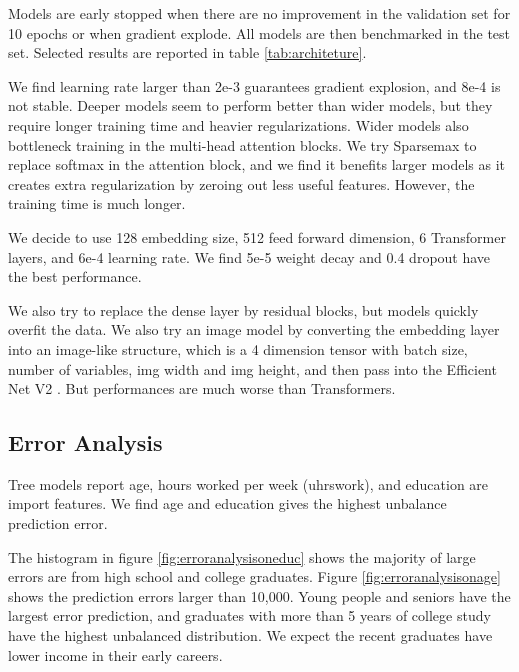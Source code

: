 \documentclass[11pt, letter,twocolumn]{article}
\begin{document}
Models are early stopped when there are no improvement in the validation set for 10 epochs or when gradient explode. All models are then benchmarked in the test set. Selected results are reported in table \ref{tab:architeture}.  
 


We find learning rate larger than 2e-3 guarantees gradient explosion, and 8e-4  is not stable.  Deeper models seem to perform better than wider models, but they require longer training time and heavier regularizations. Wider models also bottleneck training in the multi-head attention blocks. We try Sparsemax to replace softmax in the attention block, and we find it benefits larger models as it creates extra regularization by zeroing out less useful features. However, the training time is much longer.    

We decide to use 128 embedding size, 512 feed forward dimension, 6 Transformer layers, and 6e-4 learning rate. We  find 5e-5 weight decay and 0.4 dropout have the best performance. 

We also try to replace the dense layer by residual blocks, but models quickly overfit the  data. We also try an image model by converting the embedding layer into an image-like structure, which is a 4 dimension tensor with batch size, number of variables, img width and img height, and then pass into the Efficient Net V2 \parencite{tan_efficientnetv2:_2021}. But performances are much worse than Transformers. 



\subsection{Error Analysis}
Tree models report age, hours worked per week (uhrswork), and education are import features. We find age and education gives the highest unbalance prediction error. 

The histogram in figure \ref{fig:erroranalysisoneduc} shows the majority of large errors are from high school and college graduates. Figure \ref{fig:erroranalysisonage} shows the prediction errors larger than 10,000. Young people and seniors have the largest error prediction, and graduates with more than 5 years of college study have the highest unbalanced distribution. We expect the recent graduates have lower income in their early careers. 
\end{document}
